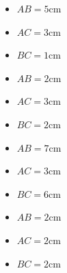 \begin{minipage}{0.22\textwidth}
    \begin{itemize}
        \item $AB=5$cm
        \item $AC=3$cm
        \item $BC=1$cm
    \end{itemize}
    \begin{center}
        \filling
    \end{center}
\end{minipage}
\hfil
\vrule
\hfil
\begin{minipage}{0.22\textwidth}
    \begin{itemize}
        \item $AB=2$cm
        \item $AC=3$cm
        \item $BC=2$cm
    \end{itemize}
    \begin{center}
        \filling
    \end{center}
\end{minipage}
\hfil
\vrule
\hfil
\begin{minipage}{0.22\textwidth}
    \begin{itemize}
        \item $AB=7$cm
        \item $AC=3$cm
        \item $BC=6$cm
    \end{itemize}
    \begin{center}
        \filling
    \end{center}
\end{minipage}
\hfil
\vrule
\hfil
\begin{minipage}{0.22\textwidth}
    \begin{itemize}
        \item $AB=2$cm
        \item $AC=2$cm
        \item $BC=2$cm
    \end{itemize}
    \begin{center}
        \filling
    \end{center}
\end{minipage}
\vfil

